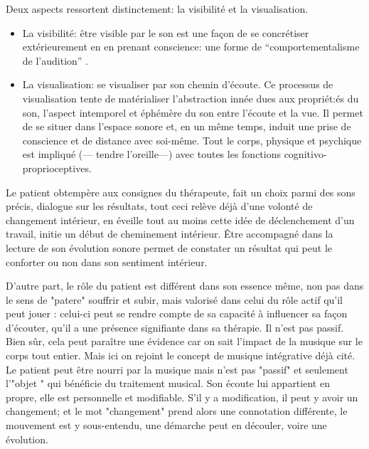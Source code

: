 Deux aspects ressortent distinctement: la visibilité et la visualisation.
\begin{itemize}
 
\item La visibilité: être visible par le son est une façon de se concrétiser extérieurement en en prenant conscience: une forme de ``comportementalisme de l'audition'' .


\item La visualisation: se visualiser par son chemin d'écoute.  
Ce processus de visualisation tente de matérialiser l'abstraction innée dues aux propriét:és du son, l'aspect intemporel et éphémère du son entre l'écoute et la vue.
Il permet de se situer dans l'espace sonore et, en un même temps, induit une prise de conscience et de distance avec soi-même. Tout le corps, physique et psychique est impliqué (--- tendre l'oreille---) avec toutes les fonctions cognitivo-proprioceptives.

\end{itemize}

Le patient obtempère aux consignes du thérapeute, fait un choix parmi des sons précis, dialogue sur les résultats, tout ceci relève déjà d'une volonté de changement intérieur, en  éveille tout au moins cette idée de déclenchement d'un travail, initie un début de cheminement intérieur.
Être accompagné dans la lecture de son évolution sonore permet de constater un résultat qui  peut le conforter ou non dans son sentiment intérieur.
	
	D'autre part, le rôle du patient est différent dans son essence même, non pas dans le sens de "patere" souffrir et subir, mais valorisé dans celui du rôle actif qu'il peut jouer : celui-ci peut se rendre compte de sa capacité à influencer sa façon d'écouter, qu'il a une présence signifiante dans sa thérapie.  Il n'est pas passif. Bien sûr, cela peut paraître une évidence car on sait l'impact de la musique sur le corps tout entier. Mais ici on rejoint  le concept de musique intégrative déjà cité\autocite[Cf.]{vrait_musicotherapie_2018}. Le patient peut être nourri par la musique mais n'est pas "passif" et seulement l'"objet " qui bénéficie du traitement musical. Son  écoute lui appartient en propre, elle est personnelle et modifiable. S'il y a modification, il peut y avoir un changement; et le mot "changement" prend alors une connotation différente,  le mouvement est y  sous-entendu,  une démarche peut en découler, voire une évolution. 





